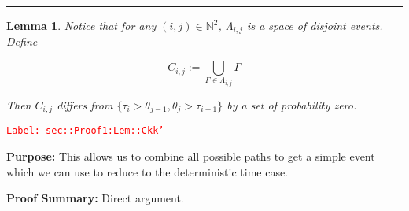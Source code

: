 \documentclass[12pt]{article}
\newcommand{\mb}{\mathbb}
\newcommand{\tr}{\textcolor{red}}
\newcommand{\labe}[1]{\tr{\texttt{Label: #1}}}
\newcommand{\purpose}{\textbf{Purpose: }}
\newcommand{\pfsum}{\textbf{Proof Summary: }}
\newcommand{\lin}{\rule{\linewidth}{0.4 pt}}
\newcommand{\indx}[1]{_{#1}}					%
\newcommand{\rt}{\tau}							%
\newcommand{\rtt}{\theta}						%
\newcommand{\apath}{\Gamma}						%
\newcommand{\pathset}[2]{\Lambda_{#1,#2}}		%
\newcommand{\pathsete}[2]{C_{#1,#2}}			%
\newtheorem{lem}[thms]{Lemma}
\begin{document}
\lin

\begin{lem}
Notice that for any \((i,j) \in \mb{N}^2\), \(\pathset{i}{j}\) is a space of disjoint events. Define

\[\pathsete{i}{j} := \bigcup_{\apath\indx{}\in\pathset{i}{j}} \apath\indx{}\]

Then \(\pathsete{i}{j}\) differs from \(\{\rt\indx{i} > \rtt\indx{j-1}, \rtt\indx{j} > \rt\indx{i-1}\}\) by a set of probability zero.
\label{sec::Proof1:Lem::Ckk'}
\end{lem}
\labe{sec::Proof1:Lem::Ckk'}

\purpose This allows us to combine all possible paths to get a simple event which we can use to reduce to the deterministic time case.

\pfsum Direct argument.
\end{document}
